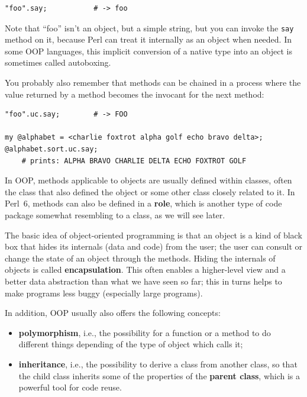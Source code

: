 \begin{verbatim}
"foo".say;           # -> foo
\end{verbatim}

Note that ``foo'' isn't an object, but a simple string, but 
you can invoke the \verb'say' method on it, because Perl 
can treat it internally as an object when needed. In some 
OOP languages, this implicit conversion of a native type 
into an object is sometimes called autoboxing.

You probably also remember that methods can be chained in a 
process where the value returned by a method becomes the 
invocant for the next method:

\begin{verbatim}
"foo".uc.say;        # -> FOO

my @alphabet = <charlie foxtrot alpha golf echo bravo delta>;
@alphabet.sort.uc.say;
    # prints: ALPHA BRAVO CHARLIE DELTA ECHO FOXTROT GOLF 
\end{verbatim}

In OOP, methods applicable to objects are usually defined 
within classes, often the class that also defined the 
object or some other class closely related to it. In Perl~6, 
methods can also be defined in a {\bf role}, which is 
another type of code package somewhat resembling to a class, 
as we will see later.

The basic idea of object-oriented programming is that an 
object is a kind of black box that hides its internals
(data and code) from the user; the user can consult or change 
the state of an object through the methods. Hiding the 
internals of objects is called {\bf encapsulation}. This 
often enables a higher-level view and a better data 
abstraction than what we have seen so far; this in turns 
helps to make programs less buggy (especially large programs).

In addition, OOP usually also offers the following concepts:
\begin{itemize}
\item {\bf polymorphism}, i.e., the possibility for a function or 
a method to do different things depending of the type of 
object which calls it;
\item {\bf inheritance}, i.e., the possibility to derive a class from 
another class, so that the child class inherits some of 
the properties of the {\bf parent class}, which is a powerful tool 
for code reuse.
\end{itemize}

